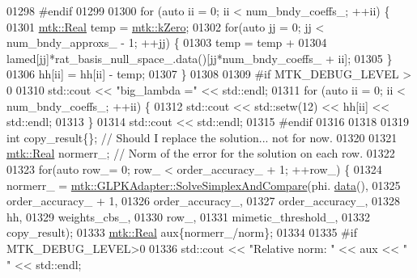 \begin{DoxyCode}
{{01298 \textcolor{preprocessor}{    #endif}
01299 
01300     \textcolor{keywordflow}{for} (\textcolor{keyword}{auto} ii = 0; ii < num\_bndy\_coeffs\_; ++ii) \{
01301       \hyperlink{group__c01-roots_gac080bbbf5cbb5502c9f00405f894857d}{mtk::Real} temp = \hyperlink{group__c01-roots_ga59a451a5fae30d59649bcda274fea271}{mtk::kZero};
01302       \textcolor{keywordflow}{for}(\textcolor{keyword}{auto} jj = 0; jj < num\_bndy\_approxs\_ - 1; ++jj) \{
01303         temp = temp +
01304           lamed[jj]*rat\_basis\_null\_space\_.data()[jj*num\_bndy\_coeffs\_ + ii];
01305       \}
01306       hh[ii] = hh[ii] - temp;
01307     \}
01308 
01309 \textcolor{preprocessor}{    #if MTK\_DEBUG\_LEVEL > 0}
01310     std::cout << \textcolor{stringliteral}{"big\_lambda ="} << std::endl;
01311     \textcolor{keywordflow}{for} (\textcolor{keyword}{auto} ii = 0; ii < num\_bndy\_coeffs\_; ++ii) \{
01312       std::cout << std::setw(12) << hh[ii] << std::endl;
01313     \}
01314     std::cout << std::endl;
01315 \textcolor{preprocessor}{    #endif}
01316 
01318 
01319     \textcolor{keywordtype}{int} copy\_result\{\};  \textcolor{comment}{// Should I replace the solution... not for now.}
01320 
01321     \hyperlink{group__c01-roots_gac080bbbf5cbb5502c9f00405f894857d}{mtk::Real} normerr\_; \textcolor{comment}{// Norm of the error for the solution on each row.}
01322 
01323     \textcolor{keywordflow}{for}(\textcolor{keyword}{auto} row\_= 0; row\_ < order\_accuracy\_ + 1; ++row\_) \{
01324       normerr\_ = \hyperlink{classmtk_1_1GLPKAdapter_a834480aca83e3c0d09fdab7fdb7e8a3f}{mtk::GLPKAdapter::SolveSimplexAndCompare}(phi.
      \hyperlink{classmtk_1_1DenseMatrix_a16b3ff56feb2658b9fc7147d1de4d8e7}{data}(),
01325                                                           order\_accuracy\_ + 1,
01326                                                           order\_accuracy\_,
01327                                                           order\_accuracy\_,
01328                                                           hh,
01329                                                           weights\_cbs\_,
01330                                                           row\_,
01331                                                           mimetic\_threshold\_,
01332                                                           copy\_result);
01333       \hyperlink{group__c01-roots_gac080bbbf5cbb5502c9f00405f894857d}{mtk::Real} aux\{normerr\_/norm\};
01334 
01335 \textcolor{preprocessor}{      #if MTK\_DEBUG\_LEVEL>0}
01336       std::cout << \textcolor{stringliteral}{"Relative norm: "} << aux << \textcolor{stringliteral}{" "} << std::endl;
}}
\end{DoxyCode}
